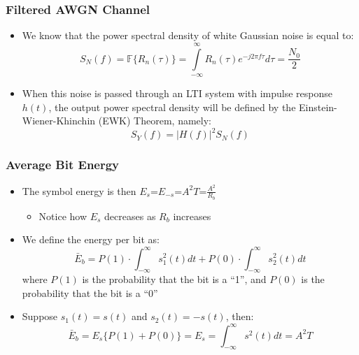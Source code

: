 \documentclass{beamer}
\begin{document}
\frame
{
  \frametitle{Filtered AWGN Channel}

  \begin{itemize}
    \item We know that the power spectral density of white Gaussian noise is equal to:
    \begin{equation}
        S_N(f)=\mathbb{F}\{R_n(\tau)\}=\int\limits_{-\infty}^{\infty}R_n(\tau)e^{-j2\pi{f}\tau}d\tau=\frac{N_0}{2}
    \end{equation}
    \item When this noise is passed through an LTI system with impulse response $h(t)$, the output power spectral density will be defined by the Einstein-Wiener-Khinchin (EWK) Theorem, namely:
    \begin{equation}
        S_Y(f)=|H(f)|^2S_N(f)
    \end{equation}
  \end{itemize}

}



\frame
{
  \frametitle{Average Bit Energy}

  \begin{itemize}
  \item The symbol energy is then $E_{s}$=$E_{-s}$=$A^2T$=$\frac{A^2}{R_b}$
    \begin{itemize}
        \item Notice how $E_{s}$ decreases as $R_{b}$ increases
    \end{itemize}
  \item We define the energy per bit as:
  \begin{equation}
    \bar{E}_{b}=P(1)\cdot\int_{-\infty}^{\infty}s_{1}^2(t)dt+P(0)\cdot\int_{-\infty}^{\infty}s_{2}^2(t)dt
  \end{equation}
  where $P(1)$ is the probability that the bit is a ``1'', and $P(0)$ is the probability that the bit is a ``0''
  \item Suppose $s_{1}(t)=s(t)$ and $s_{2}(t)=-s(t)$, then:
  \begin{equation}
    \bar{E}_{b}=E_{s}\{P(1)+P(0)\}=E_{s}=\int_{-\infty}^{\infty}s^2(t)dt=A^2T
  \end{equation}
  \end{itemize}

}
\end{document}
